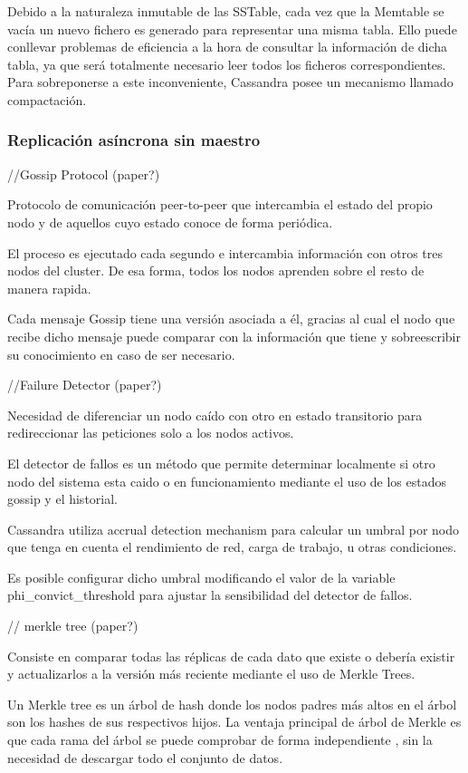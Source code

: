 Debido a la naturaleza inmutable de las SSTable, cada vez que la Memtable se vacía un nuevo fichero es generado para representar una misma tabla. Ello puede conllevar problemas de eficiencia a la hora de consultar la información de dicha tabla, ya que será totalmente necesario leer todos los ficheros correspondientes. Para sobreponerse a este inconveniente, Cassandra posee un mecanismo llamado compactación.

\subsubsection{Replicación asíncrona sin maestro}

//Gossip Protocol (paper?)

Protocolo de comunicación peer-to-peer que intercambia el estado del propio nodo y de aquellos cuyo estado conoce de forma periódica.

El proceso es ejecutado cada segundo e intercambia información con otros tres nodos del cluster. De esa forma, todos los nodos aprenden sobre el resto de manera rapida.

Cada mensaje Gossip tiene una versión asociada a él, gracias al cual el nodo que recibe dicho mensaje puede comparar con la información que tiene y sobreescribir su conocimiento en caso de ser necesario.

//Failure Detector (paper?)

Necesidad de diferenciar un nodo caído con otro en estado transitorio para redireccionar las peticiones solo a los nodos activos.

El detector de fallos es un método que permite determinar localmente si otro nodo del sistema esta caido o en funcionamiento mediante el uso de los estados gossip y el historial.

Cassandra utiliza accrual detection mechanism para calcular un umbral por nodo que tenga en cuenta el rendimiento de red, carga de trabajo, u otras condiciones.

Es posible configurar dicho umbral modificando el valor de la variable phi_convict_threshold para ajustar la sensibilidad del detector de fallos.

// merkle tree (paper?)

Consiste en comparar todas las réplicas de cada dato que existe o debería existir y actualizarlos a la versión más reciente mediante el uso de Merkle Trees.

Un Merkle tree es un árbol de hash donde los nodos padres más altos en el árbol son los hashes de sus respectivos hijos. La ventaja principal de árbol de Merkle es que cada rama del árbol se puede comprobar de forma independiente , sin la necesidad de descargar todo el conjunto de datos.

